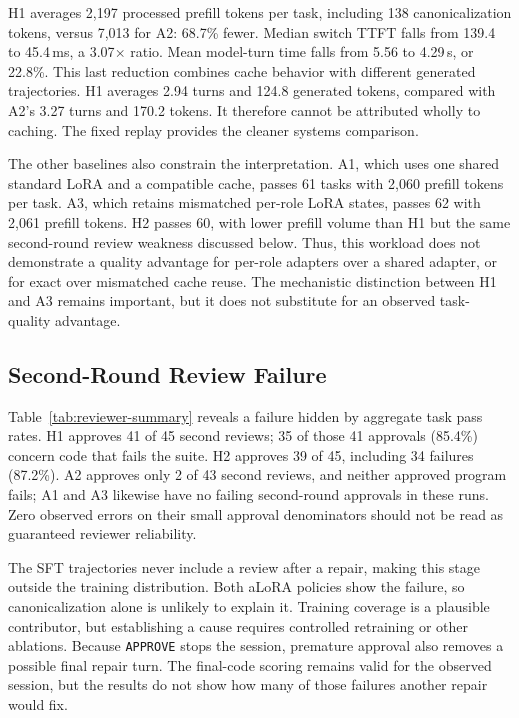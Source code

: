 \documentclass[10pt,twocolumn,letterpaper]{article}
\begin{document}
H1 averages 2,197 processed prefill tokens per task, including 138
canonicalization tokens, versus 7,013 for A2: 68.7\% fewer. Median switch
TTFT falls from 139.4 to 45.4\,ms, a 3.07$\times$ ratio. Mean model-turn
time falls from 5.56 to 4.29\,s, or 22.8\%. This last reduction combines
cache behavior with different generated trajectories. H1 averages 2.94
turns and 124.8 generated tokens, compared with A2's 3.27 turns and 170.2
tokens. It therefore cannot be attributed wholly to caching. The fixed
replay provides the cleaner systems comparison.

The other baselines also constrain the interpretation. A1, which uses one
shared standard LoRA and a compatible cache, passes 61 tasks with 2,060
prefill tokens per task. A3, which retains mismatched per-role LoRA states,
passes 62 with 2,061 prefill tokens. H2 passes 60, with lower prefill volume
than H1 but the same second-round review weakness discussed below. Thus,
this workload does not demonstrate a quality advantage for per-role
adapters over a shared adapter, or for exact over mismatched cache reuse.
The mechanistic distinction between H1 and A3 remains important, but it
does not substitute for an observed task-quality advantage.

\subsection{Second-Round Review Failure}
Table~\ref{tab:reviewer-summary} reveals a failure hidden by aggregate task
pass rates. H1 approves 41 of 45 second reviews; 35 of those 41 approvals
(85.4\%) concern code that fails the suite. H2 approves 39 of 45, including
34 failures (87.2\%). A2 approves only 2 of 43 second reviews, and neither
approved program fails; A1 and A3 likewise have no failing second-round
approvals in these runs. Zero observed errors on their small approval
denominators should not be read as guaranteed reviewer reliability.

\begin{table}[!t]
\centering
\small

\caption{Second-round Reviewer decisions. ``Failed / approved'' counts
suite-failing final programs among second-round approvals. A dash denotes
no approvals. These are conditional counts for the tasks that reached this
round, not matched subsets across methods.}
\label{tab:reviewer-summary}
\end{table}

The SFT trajectories never include a review after a repair, making this
stage outside the training distribution. Both aLoRA policies show the
failure, so canonicalization alone is unlikely to explain it. Training
coverage is a plausible contributor, but establishing a cause requires
controlled retraining or other ablations. Because \texttt{APPROVE} stops
the session, premature approval also removes a possible final repair turn.
The final-code scoring remains valid for the observed session, but the
results do not show how many of those failures another repair would fix.
\end{document}
